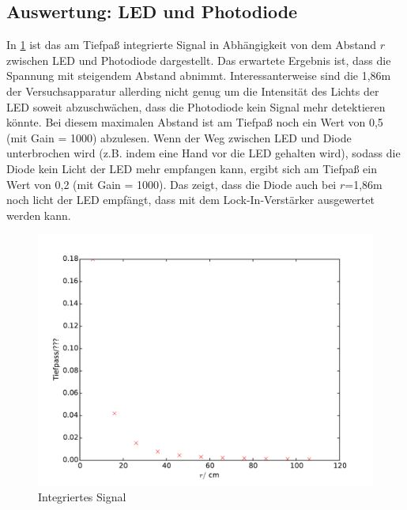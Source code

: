 \subsection{Auswertung: LED und Photodiode}



In \ref{fig:plot4} ist das am Tiefpaß integrierte Signal in Abhängigkeit von
dem Abstand $r$ zwischen LED und Photodiode dargestellt. Das erwartete Ergebnis
ist, dass die Spannung mit steigendem Abstand abnimmt. Interessanterweise
sind die 1,86m der Versuchsapparatur allerding nicht genug um die Intensität
des Lichts der LED soweit abzuschwächen, dass die Photodiode kein Signal
mehr detektieren könnte. Bei diesem maximalen Abstand ist am Tiefpaß noch ein
Wert von 0,5 (mit Gain = 1000) abzulesen. Wenn der Weg zwischen LED und
Diode unterbrochen wird (z.B. indem eine Hand vor die LED gehalten wird),
sodass die Diode kein Licht der LED mehr empfangen kann, ergibt sich am
Tiefpaß ein Wert von 0,2 (mit Gain = 1000). Das zeigt, dass die Diode auch
bei $r$=1,86m noch licht der LED empfängt, dass mit dem Lock-In-Verstärker
ausgewertet werden kann.
\begin{figure}
  \centering
  \includegraphics[width=\textwidth]{plot4.pdf}
  \caption{Integriertes Signal}
  \label{fig:plot4}
\end{figure}
